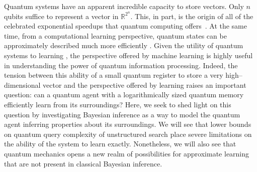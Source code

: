 \documentclass[aps,amsmath,onecolumn,amssymb]{revtex4}
\begin{document}

Quantum systems have an apparent incredible capacity to store vectors.  Only $n$ qubits suffice to represent a vector in $\mathbb{R}^{2^n}$.  This, in part, is the origin of all of the celebrated exponential speedups that quantum computing offers~\cite{shor1994algorithms,lloyd1996universal,childs2003exponential,harrow2009quantum}.
At the same time, from a computational learning perspective, quantum states can be approximately described
much more efficiently \cite{aaronson_learnability_2007}. Given the utility of quantum systems
to learning \cite{wiebe_using_2014}, the perspective offered by machine learning is highly useful
in understanding the power of quantum information processing.
Indeed, the tension between this ability of a small quantum register to store a very high--dimensional vector and the perspective offered by learning raises an important question: can a quantum agent with a logarithmically sized quantum memory efficiently learn from its surroundings?
Here, we seek to shed light on this question by investigating Bayesian inference as a way to model the quantum agent inferring properties about its surroundings.  We will see that lower bounds on quantum query complexity of unstructured search place severe limitations on the ability of the system to learn exactly.  Nonetheless, we will also see that quantum mechanics opens a new realm of possibilities for approximate learning that are not present in classical Bayesian inference.
\end{document}

